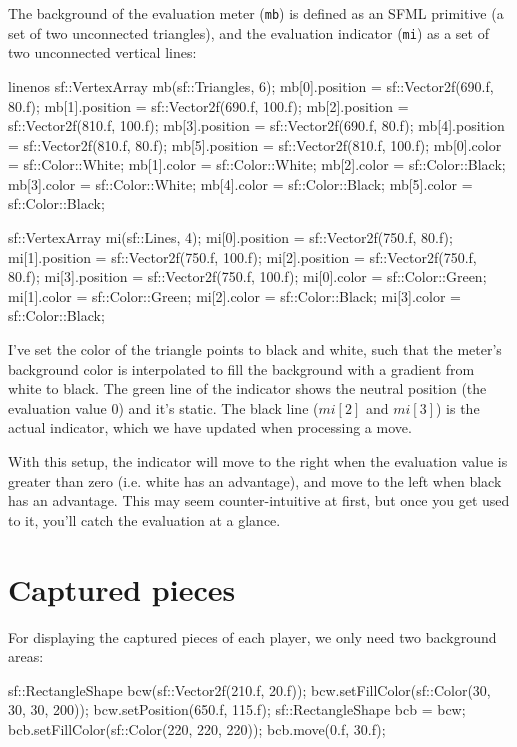 The background of the evaluation meter (\texttt{mb}) is defined as an SFML primitive
(a set of two unconnected triangles), and the evaluation indicator (\texttt{mi})
as a set of two unconnected vertical lines:

\begin{cpp*}{linenos}
sf::VertexArray mb(sf::Triangles, 6);
mb[0].position = sf::Vector2f(690.f, 80.f);
mb[1].position = sf::Vector2f(690.f, 100.f);
mb[2].position = sf::Vector2f(810.f, 100.f);
mb[3].position = sf::Vector2f(690.f, 80.f);
mb[4].position = sf::Vector2f(810.f, 80.f);
mb[5].position = sf::Vector2f(810.f, 100.f);
mb[0].color = sf::Color::White;
mb[1].color = sf::Color::White;
mb[2].color = sf::Color::Black;
mb[3].color = sf::Color::White;
mb[4].color = sf::Color::Black;
mb[5].color = sf::Color::Black;

sf::VertexArray mi(sf::Lines, 4);
mi[0].position = sf::Vector2f(750.f, 80.f);
mi[1].position = sf::Vector2f(750.f, 100.f);
mi[2].position = sf::Vector2f(750.f, 80.f);
mi[3].position = sf::Vector2f(750.f, 100.f);
mi[0].color = sf::Color::Green;
mi[1].color = sf::Color::Green;
mi[2].color = sf::Color::Black;
mi[3].color = sf::Color::Black;
\end{cpp*}

I've set the color of the triangle points to black and white, such that the meter's 
background color is interpolated to fill the background with a gradient from white to black.
The green line of the indicator shows the neutral position (the evaluation value 0) and it's
static.
The black line ($mi[2]$ and $mi[3]$) is the actual indicator, which we have
updated when processing a move.

With this setup, the indicator will move to the right when the evaluation value is greater than
zero (i.e. white has an advantage), and move to the left when black has an advantage.
This may seem counter-intuitive at first, but once you get used to it, you'll catch the
evaluation at a glance.

\section{Captured pieces}

For displaying the captured pieces of each player, we only need two background areas:

\begin{cpp}
sf::RectangleShape bcw(sf::Vector2f(210.f, 20.f));
bcw.setFillColor(sf::Color(30, 30, 30, 200));
bcw.setPosition(650.f, 115.f);
sf::RectangleShape bcb = bcw;
bcb.setFillColor(sf::Color(220, 220, 220));
bcb.move(0.f, 30.f);
\end{cpp}

